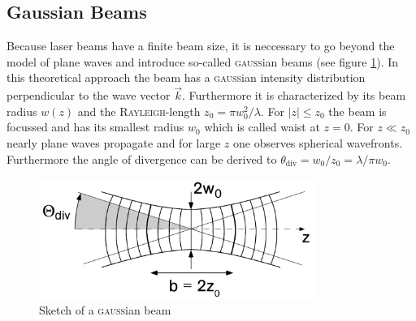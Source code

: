 \documentclass{protokoll_en}
\begin{document}
\subsection{Gaussian Beams}
\label{cha:gauss}
Because laser beams have a finite beam size, it is neccessary to go beyond the model of plane waves and introduce so-called \textsc{gauss}ian beams (see figure \ref{fig:gaussianbeams}). In this theoretical approach the beam has a \textsc{gauss}ian intensity distribution perpendicular to the wave vector $\vec{k}$. Furthermore it is characterized by its beam radius $w(z)$ and the \textsc{Rayleigh}-length $z_0 = \pi w^2_0/\lambda$. For $|z| \leq z_0$ the beam is focussed and has its smallest radius $w_0$ which is called waist at $z=0$. For $z \ll z_0$ nearly plane waves propagate and for large $z$ one observes spherical wavefronts. Furthermore the angle of divergence can be derived to $\theta_{\mathrm{div}} = w_0/z_0 = \lambda/\pi w_0$.
\begin{figure}[H]
	\centering
		\includegraphics[width=0.8\textwidth]{graphics/gaussianbeams}
	\caption{Sketch of a \textsc{gauss}ian beam~\cite{meschi}}
	\label{fig:gaussianbeams}
\end{figure}
\end{document}
